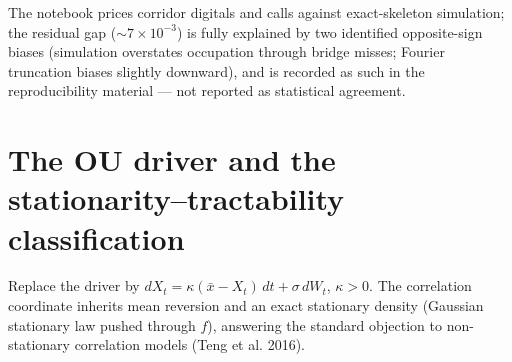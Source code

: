 \documentclass[
  english,
  10pt,
  letterpaper,
  DIV=11,
  numbers=noendperiod]{scrartcl}
\theoremstyle{plain}
\theoremstyle{plain}
\theoremstyle{plain}
\theoremstyle{plain}
\theoremstyle{definition}
\theoremstyle{remark}
\begin{document}
The notebook prices corridor digitals and calls against exact-skeleton
simulation; the residual gap (\(\sim7\times10^{-3}\)) is fully explained
by two identified opposite-sign biases (simulation overstates occupation
through bridge misses; Fourier truncation biases slightly downward), and
is recorded as such in the reproducibility material --- not reported as
statistical agreement.

\section{The OU driver and the stationarity--tractability
classification}\label{sec-ou}

Replace the driver by \(dX_t=\kappa(\bar x-X_t)\,dt+\sigma\,dW_t\),
\(\kappa>0\). The correlation coordinate inherits mean reversion and an
exact stationary density (Gaussian stationary law pushed through \(f\)),
answering the standard objection to non-stationary correlation models
(Teng et al. 2016).
\end{document}
